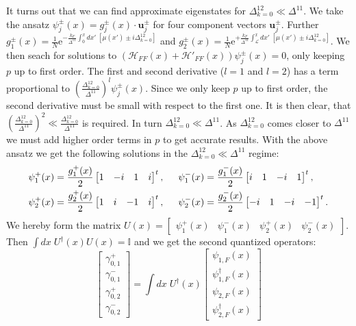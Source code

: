It turns out that we can find approximate eigenstates for $\Delta^{12}_{k=0} \ll \Delta^{11}$. We take the ansatz $\psi_j^{\pm}(x) = g_j^{\pm}(x)\cdot \mathbf{u}^{\pm}_j$ for four component vectors $\mathbf{u}^{\pm}_j$. Further $g_1^{\pm}(x) = \frac{1}{N}\text{e}^{-\frac{k_F}{\Delta^{11}}\int_0^x dx' \; \left[\mu(x') \pm i\Delta^{12}_{k=0}\right] }$ and $g_2^{\pm}(x) = \frac{1}{N}\text{e}^{+\frac{k_F}{\Delta^{11}}\int_{\mathcal{L}}^x dx' \; \left[\mu(x') \pm i\Delta^{12}_{k=0}\right] }$. We then seach for solutions to $(\mathcal{H}_{FF}(x) + \mathcal{H}'_{FF}(x))\psi_j^{\pm}(x) = 0$, only keeping $p$ up to first order. The first and second derivative ($l = 1$ and $l = 2$) has a term proportional to $\left(\frac{\Delta^{12}_{k=0}}{\Delta^{11}}\right)^l\psi_j^{\pm}(x)$. Since we only keep $p$ up to first order, the second derivative must be small with respect to the first one. It is then clear, that $\left(\frac{\Delta^{12}_{k=0}}{\Delta^{11}}\right)^2 \ll \frac{\Delta^{12}_{k=0}}{\Delta^{11}}$ is required. In turn $\Delta^{12}_{k=0} \ll \Delta^{11}$. As $\Delta^{12}_{k=0}$ comes closer to $\Delta^{11}$ we must add higher order terms in $p$ to get accurate results. With the above ansatz we get the following solutions in the $\Delta^{12}_{k=0} \ll \Delta^{11}$ regime:
\begin{align}
\psi_1^{+}(x) &= \frac{g_1^{+}(x)}{2}\begin{bmatrix} 1 & -i & 1 & i \end{bmatrix}^t, \hspace{0.5cm} \psi_1^{-}(x) = \frac{g_1^{-}(x)}{2}\begin{bmatrix} i & 1 & -i & 1 \end{bmatrix}^t, \nonumber \\
\psi_2^{+}(x) &= \frac{g_2^{+}(x)}{2}\begin{bmatrix} 1 & i & -1 & i \end{bmatrix}^t, \hspace{0.5cm} \psi_2^{-}(x) = \frac{g_2^{-}(x)}{2}\begin{bmatrix} -i & 1 & -i & -1 \end{bmatrix}^t.
\label{eq.zeromodesDelta12real}
\end{align}
We hereby form the matrix $U(x) = \begin{bmatrix} \psi_1^{+}(x) & \psi_1^{-}(x) & \psi_2^{+}(x) & \psi_2^{-}(x) \end{bmatrix}$. Then $\int dx \; U^\dagger(x) U(x) = \mathbb{I}$ and we get the second quantized operators:
\begin{equation}
\begin{bmatrix} \gamma^{+}_{0, 1} \\ \gamma^{-}_{0, 1} \\ \gamma^{+}_{0, 2} \\ \gamma^{-}_{0, 2} \end{bmatrix} = \int dx \; U^\dagger(x) \begin{bmatrix} \psi_{1, F}(x) \\ \psi_{1, F}^\dagger(x) \\ \psi_{2, F}(x) \\ \psi_{2, F}^\dagger(x) \end{bmatrix} \nonumber
\end{equation}
